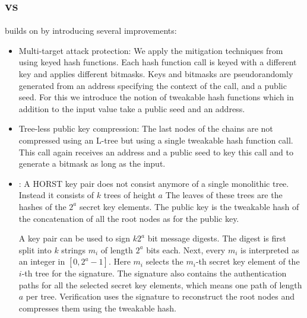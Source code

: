 \subsection{\spx vs \spc} \spx builds on \spc by introducing several improvements: 
\begin{itemize}
 \item Multi-target attack protection: We apply the mitigation techniques from 
 \cite{Huelsing2016} using keyed hash functions. Each hash function call is 
 keyed with a different key and applies different bitmasks. Keys and bitmasks are
 pseudorandomly generated from an address specifying the context of the call, and
 a public seed. For this we introduce the notion of tweakable hash functions 
 which in addition to the input value take a public seed and an address.

 \item Tree-less \wotsp public key compression: The last nodes of the \wotsp chains 
 are not compressed using an L-tree but using a single tweakable hash function 
 call. This call again receives an address and a public seed to key this call and to
 generate a bitmask as long as the input. 


 \item \fors: A HORST key pair does not consist anymore of a single
 monolithic tree. Instead it consists of $k$ trees of height $a$ %
 The leaves of these trees are the hashes of the $2^a$ secret key elements. %
 The public key is the tweakable hash of the concatenation of all the root 
 nodes as for the \wotsp public key. 
 
 A \fors key pair can be used to sign $k2^a$%
 bit message digests. %
 The digest is first split into $k$ strings $m_i$ of length $2^a$ bits each. %
 Next, every $m_i$ is interpreted as an integer in $[0,2^a -1]$. %
 Here $m_i$ selects the $m_i$-th secret key element of the
 $i$-th tree for the signature. The signature also contains the authentication
 paths for all the selected secret key elements, which means one path of length %
 $a$ per tree. Verification uses the signature to reconstruct the root nodes %
 and compresses them using the tweakable hash.


\end{itemize}
